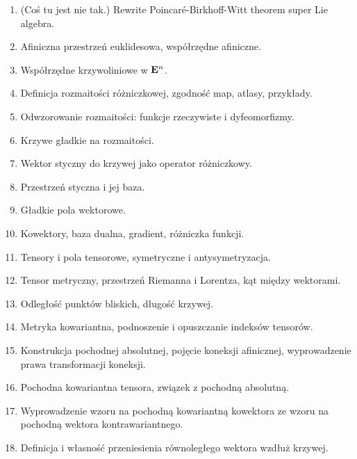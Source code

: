 \documentclass[a4paper,11pt]{article}
\begin{document}
\begin{enumerate}
\item (Coś tu jest nie tak.) Rewrite Poincar\'{e}-Birkhoff-Witt
  theorem super Lie algebra.

\item Afiniczna przestrzeń euklidesowa, współrzędne afiniczne.

\item Współrzędne krzywoliniowe w $\mathbf{E}^{ n }$.

\item Definicja rozmaitości różniczkowej, zgodność map, atlasy,
  przykłady.

\item Odwzorowanie rozmaitości: funkcje rzeczywiste i dyfeomorfizmy.

\item Krzywe gładkie na rozmaitości.

\item Wektor styczny do krzywej jako operator różniczkowy.

\item Przestrzeń styczna i jej baza.

\item Gładkie pola wektorowe.

\item Kowektory, baza dualna, gradient, różniczka funkcji.

\item Tensory i pola tensorowe, symetryczne i antysymetryzacja.

\item Tensor metryczny, przestrzeń Riemanna i Lorentza, kąt między
  wektorami.

\item Odległość punktów bliskich, długość krzywej.

\item Metryka kowariantna, podnoszenie i opuszczanie indeksów
  tensorów.

\item Konstrukcja pochodnej absolutnej, pojęcie koneksji afinicznej,
  wyprowadzenie prawa transformacji koneksji.

\item Pochodna kowariantna tensora, związek z pochodną absolutną.

\item Wyprowadzenie wzoru na pochodną kowariantną kowektora ze wzoru
  na pochodną wektora kontrawariantnego.

\item Definicja i własność przeniesienia równoległego wektora wzdłuż
  krzywej.


\end{enumerate}
\end{document}
